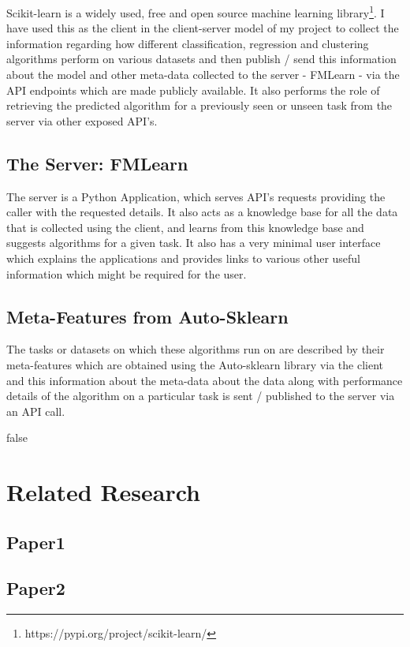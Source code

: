 Scikit-learn \citep{scikit-learn} is a widely used, free and open source machine learning library\footnote{https://pypi.org/project/scikit-learn/}. I have used this as the client in the client-server model of my project to collect the information regarding how different classification, regression and clustering algorithms perform on various datasets and then publish / send this information about the model and other meta-data collected to the server - FMLearn - via the API endpoints which are made publicly available. It  also performs the role of retrieving the predicted algorithm for a previously seen or unseen task from the server via other exposed API's.

\subsection{The Server: FMLearn}
The server is a Python Application, which serves API's requests providing the caller with the requested details. It also acts as a knowledge base for all the data that is collected using the client, and learns from this knowledge base and suggests algorithms for a given task. It also has a very minimal user interface which explains the applications and provides links to various other useful information which might be required for the user.

\subsection{Meta-Features from Auto-Sklearn}
The tasks or datasets on which these algorithms run on are described by their meta-features which are obtained using the Auto-sklearn \citep{feurer:m} library via the client and this information about the meta-data about the data along with performance details of the algorithm on a particular task is sent / published to the server via an API call.

\if false

\section{Related Research}

\subsection{Paper1}
\subsection{Paper2}
